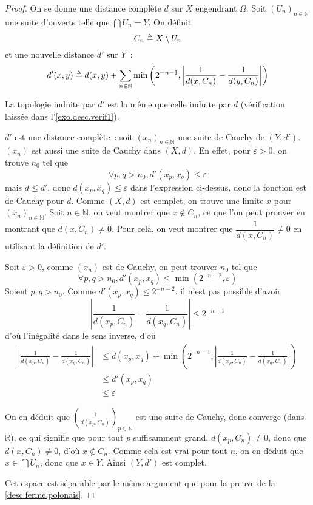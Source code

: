 \begin{proof}
  On se donne une distance complète $d$ sur $X$ engendrant $\Omega$. Soit
  $(U_n)_{n\in\mathbb N}$ une suite d'ouverts telle que $\bigcap U_n = Y$. On
  définit
  \[C_n \triangleq X\setminus U_n\]
  et une nouvelle distance $d'$ sur $Y$~:
  \[d'(x,y) \triangleq d(x,y) + \sum_{n\in \mathbb N} \min\left(2^{-n-1},
  \left|\frac{1}{d(x,C_n)} - \frac{1}{d(y,C_n)}\right|
  \right)\]

  La topologie induite par $d'$ est la même que celle induite par $d$
  (vérification laissée dans l'\cref{exo.desc.verif1}).

  $d'$ est une distance complète~: soit $(x_n)_{n\in\mathbb N}$ une suite de
  Cauchy de $(Y,d')$. $(x_n)$ est aussi une suite de Cauchy dans $(X,d)$. En
  effet, pour $\varepsilon > 0$, on trouve $n_0$ tel que
  \[\forall p,q > n_0, d'(x_p,x_q) \leq \varepsilon\]
  mais $d \leq d'$, donc $d(x_p,x_q) \leq \varepsilon$ dans l'expression
  ci-dessus, donc la fonction est de Cauchy pour $d$. Comme $(X,d)$ est complet,
  on trouve une limite $x$ pour $(x_n)_{n\in\mathbb N}$. Soit $n\in \mathbb N$, on
  veut montrer que $x\notin C_n$, ce que l'on peut prouver en montrant que
  $d(x,C_n) \neq 0$. Pour cela, on veut montrer que
  $\dfrac{1}{d(x,C_n)} \neq 0$ en utilisant la définition de $d'$.

  Soit $\varepsilon > 0$, comme $(x_n)$ est de Cauchy, on peut trouver $n_0$ tel
  que
  \[\forall p,q > n_0, d'(x_p,x_q) \leq \min(2^{-n-2}, \varepsilon)\]
  Soient $p,q > n_0$. Comme $d'(x_p,x_q) \leq 2^{-n-2}$, il n'est pas possible
  d'avoir
  \[\left|\frac{1}{d(x_p,C_n)}-\frac{1}{d(x_q,C_n)}\right| \leq 2^{-n-1}\]
  d'où l'inégalité dans le sens inverse, d'où
  \begin{align*}
    \left|\frac{1}{d(x_p,C_n)} - \frac{1}{d(x_q,C_n)}\right| & \leq
    d(x_p,x_q) + \min\left(2^{-n-1},\left|\frac{1}{d(x_p,C_n)}
    - \frac{1}{d(x_q,C_n)}\right|\right)\\
    &\leq d'(x_p,x_q)\\
    &\leq \varepsilon
  \end{align*}

  On en déduit que
  $\displaystyle\left(\frac{1}{d(x_p,C_n)}\right)_{p\in\mathbb N}$ est une
  suite de Cauchy, donc converge (dans $\mathbb R$), ce qui signifie que
  pour tout $p$ suffisamment grand, $d(x_p,C_n) \neq 0$, donc que
  $d(x,C_n) \neq 0$, d'où $x\notin C_n$. Comme cela est vrai pour tout $n$, on
  en déduit que $x\in \bigcap U_n$, donc que $x\in Y$. Ainsi $(Y,d')$ est
  complet.

  Cet espace est séparable par le même argument que pour la preuve de la
  \cref{desc.ferme.polonais}.
\end{proof}

